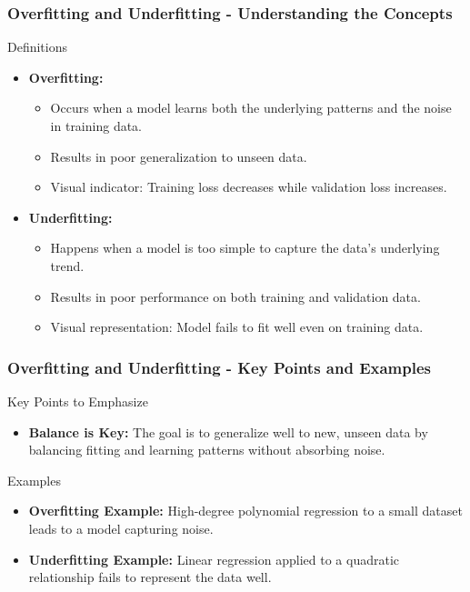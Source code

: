 \documentclass[aspectratio=169]{beamer}
\begin{document}
\begin{frame}[fragile]
    \frametitle{Overfitting and Underfitting - Understanding the Concepts}
    
    \begin{block}{Definitions}
        \begin{itemize}
            \item \textbf{Overfitting:}
            \begin{itemize}
                \item Occurs when a model learns both the underlying patterns and the noise in training data.
                \item Results in poor generalization to unseen data.
                \item Visual indicator: Training loss decreases while validation loss increases.
            \end{itemize}
            \item \textbf{Underfitting:}
            \begin{itemize}
                \item Happens when a model is too simple to capture the data's underlying trend.
                \item Results in poor performance on both training and validation data.
                \item Visual representation: Model fails to fit well even on training data.
            \end{itemize}
        \end{itemize}
    \end{block}
\end{frame}

\begin{frame}[fragile]
    \frametitle{Overfitting and Underfitting - Key Points and Examples}

    \begin{block}{Key Points to Emphasize}
        \begin{itemize}
            \item \textbf{Balance is Key:} The goal is to generalize well to new, unseen data by balancing fitting and learning patterns without absorbing noise.
        \end{itemize}
    \end{block}

    \begin{block}{Examples}
        \begin{itemize}
            \item \textbf{Overfitting Example:} High-degree polynomial regression to a small dataset leads to a model capturing noise.
            \item \textbf{Underfitting Example:} Linear regression applied to a quadratic relationship fails to represent the data well.
        \end{itemize}
    \end{block}
\end{frame}
\end{document}
